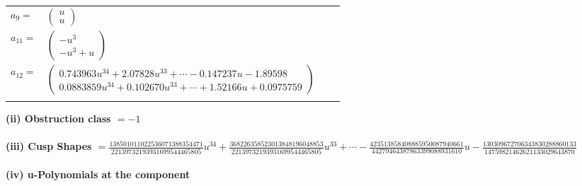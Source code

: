 \documentclass[1p]{elsarticle_modified}
\theoremstyle{definition}
\begin{document}
\begin{tabular}{m{7pt} m{180pt} m{7pt} m{180pt} }
\flushright $a_{9}=$&$\begin{pmatrix}u\\u\end{pmatrix}$ \\
\flushright $a_{11}=$&$\begin{pmatrix}- u^3\\- u^3+u\end{pmatrix}$ \\
\flushright $a_{12}=$&$\begin{pmatrix}0.743963 u^{34}+2.07828 u^{33}+\cdots-0.147237 u-1.89598\\0.0883859 u^{34}+0.102670 u^{33}+\cdots+1.52166 u+0.0975759\end{pmatrix}$\\&\end{tabular}
\flushleft \textbf{(ii) Obstruction class $= -1$}\\~\\
\flushleft \textbf{(iii) Cusp Shapes $= \frac{138501011022536071388354471}{22139732193931699544465805} u^{34}+\frac{368226358523013848196048853}{22139732193931699544465805} u^{33}+\cdots-\frac{423513858408885950087940661}{44279464387863399088931610} u-\frac{130309672706343830288860133}{14759821462621133029643870}$}\\~\\
\newpage\renewcommand{\arraystretch}{1}
\flushleft \textbf{(iv) u-Polynomials at the component}\newline \\
\end{document}
